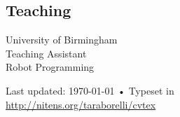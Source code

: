 \documentclass[10pt, a4paper]{article}
\newcommand{\years}[1]{\marginnote{\scriptsize #1}}
\begin{document}
\subsection*{Teaching}
\years{2012}
\textmd{University of Birmingham}\\
Teaching Assistant\\
Robot Programming





\vspace{1cm}
\vfill{}
\begin{center}
  {\scriptsize  Last updated: \today\- •\-
    Typeset in \href{http://nitens.org/taraborelli/cvtex}{
      \XeTeX }\\
    \href{http://nitens.org/taraborelli/cvtex}{http://nitens.org/taraborelli/cvtex}}
\end{center}
\end{document}
